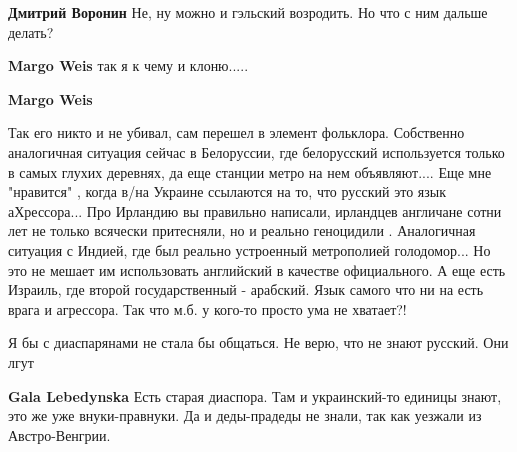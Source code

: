 \begin{itemize}
\begin{itemize}
\textbf{Дмитрий Воронин} Не, ну можно и гэльский возродить. Но что с ним дальше делать?

 
\textbf{Margo Weis} так я к чему и клоню.....

 
\textbf{Margo Weis} 

Так его никто и не убивал, сам перешел в элемент фольклора. Собственно
аналогичная ситуация сейчас в Белоруссии, где белорусский используется только в
самых глухих деревнях, да еще станции метро на нем объявляют.... Еще мне
"нравится" , когда в/на Украине ссылаются на то, что русский это язык
аХрессора... Про Ирландию вы правильно написали, ирландцев англичане сотни лет
не только всячески притесняли, но и реально геноцидили . Аналогичная ситуация с
Индией, где был реально устроенный метрополией голодомор... Но это не мешает им
использовать английский в качестве официального. А еще есть Израиль, где второй
государственный - арабский. Язык самого что ни на есть врага и агрессора. Так
что м.б. у кого-то просто ума не хватает?!

\end{itemize}

 

Я бы с диаспарянами не стала бы общаться. Не верю, что не знают русский. Они
лгут

\begin{itemize}
 
\textbf{Gala Lebedynska} Есть старая диаспора. Там и украинский-то единицы
знают, это же уже внуки-правнуки. Да и деды-прадеды не знали, так как уезжали
из Австро-Венгрии.
\end{itemize}


\end{itemize}
